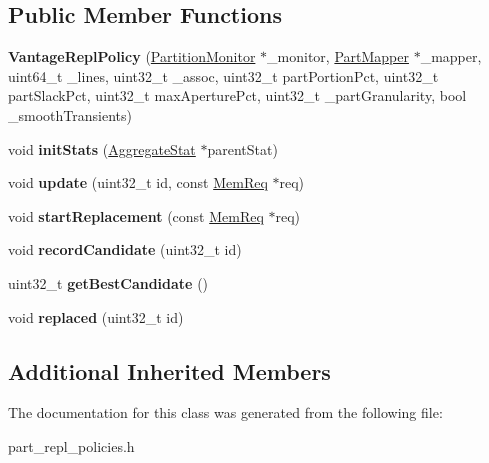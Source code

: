 \subsection*{Public Member Functions}
\begin{DoxyCompactItemize}
\item 
\hypertarget{classVantageReplPolicy_ab2458a07dbcda64cbcc4e01a04b6fd4a}{{\bfseries Vantage\-Repl\-Policy} (\hyperlink{classPartitionMonitor}{Partition\-Monitor} $\ast$\-\_\-monitor, \hyperlink{classPartMapper}{Part\-Mapper} $\ast$\-\_\-mapper, uint64\-\_\-t \-\_\-lines, uint32\-\_\-t \-\_\-assoc, uint32\-\_\-t part\-Portion\-Pct, uint32\-\_\-t part\-Slack\-Pct, uint32\-\_\-t max\-Aperture\-Pct, uint32\-\_\-t \-\_\-part\-Granularity, bool \-\_\-smooth\-Transients)}\label{classVantageReplPolicy_ab2458a07dbcda64cbcc4e01a04b6fd4a}

\item 
\hypertarget{classVantageReplPolicy_a4ef29a79720b88885374af04e23d237c}{void {\bfseries init\-Stats} (\hyperlink{classAggregateStat}{Aggregate\-Stat} $\ast$parent\-Stat)}\label{classVantageReplPolicy_a4ef29a79720b88885374af04e23d237c}

\item 
\hypertarget{classVantageReplPolicy_a281d05b9d69bb6acf223cf06e326ec35}{void {\bfseries update} (uint32\-\_\-t id, const \hyperlink{structMemReq}{Mem\-Req} $\ast$req)}\label{classVantageReplPolicy_a281d05b9d69bb6acf223cf06e326ec35}

\item 
\hypertarget{classVantageReplPolicy_ab5c16020ae5ad77478facd28c9c10d0e}{void {\bfseries start\-Replacement} (const \hyperlink{structMemReq}{Mem\-Req} $\ast$req)}\label{classVantageReplPolicy_ab5c16020ae5ad77478facd28c9c10d0e}

\item 
\hypertarget{classVantageReplPolicy_a0ca714989c8e4f7f1cb2d8ebcd37f6b8}{void {\bfseries record\-Candidate} (uint32\-\_\-t id)}\label{classVantageReplPolicy_a0ca714989c8e4f7f1cb2d8ebcd37f6b8}

\item 
\hypertarget{classVantageReplPolicy_abb51e687eba9ea5a7d05313b92a48dd1}{uint32\-\_\-t {\bfseries get\-Best\-Candidate} ()}\label{classVantageReplPolicy_abb51e687eba9ea5a7d05313b92a48dd1}

\item 
\hypertarget{classVantageReplPolicy_a40be15cb18b2145b7dae15b157b519c0}{void {\bfseries replaced} (uint32\-\_\-t id)}\label{classVantageReplPolicy_a40be15cb18b2145b7dae15b157b519c0}

\end{DoxyCompactItemize}
\subsection*{Additional Inherited Members}


The documentation for this class was generated from the following file\-:\begin{DoxyCompactItemize}
\item 
part\-\_\-repl\-\_\-policies.\-h\end{DoxyCompactItemize}
